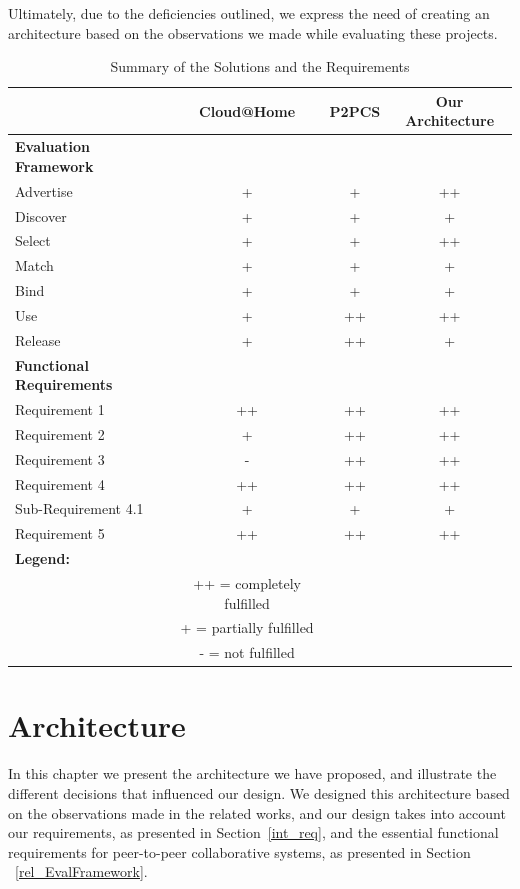 \documentclass[12pt, titlepage]{uo_temp}
\begin{document}
     Ultimately, due to the deficiencies outlined, we express the need of creating an
     architecture based on the observations we made while evaluating these projects.
     \\
     
     \begin{table}
     \begin{tabular}{l*{3}{c}}
       & Cloud@Home & P2PCS & Our Architecture \\ 
       \hline
       \textbf{Evaluation Framework}\\
       \hline
       Advertise & + & + & ++ \\
       Discover & + & + & + \\
       Select & + & + & ++ \\
       Match & + & + & + \\
       Bind & + & + & + \\
       Use & + & ++ & ++ \\
       Release & + & ++ & + \\
       \hline
       \hline
       \textbf{Functional Requirements}\\
       \hline
       Requirement 1 & ++ & ++ & ++ \\
       Requirement 2 & + & ++ & ++ \\
       Requirement 3 & - & ++ & ++ \\
       Requirement 4 & ++ & ++ & ++ \\
       Sub-Requirement 4.1 & + & + & + \\
       Requirement 5 & ++ & ++ & ++ \\
       \hline
       \hline
       \textbf{Legend:} &&&\\
       & ++ = completely fulfilled &&\\
       & + = partially fulfilled &&\\
       & - = not fulfilled &&\\
     \end{tabular}
     \caption{Summary of the Solutions and the Requirements}
     \end{table}


     \chapter{Architecture}\label{arch_chap}
     In this chapter we present the architecture we have proposed, and illustrate the
     different decisions that influenced our design. We designed this architecture based
     on the observations made in the related works, and our design takes into account our
     requirements, as presented in Section~\ref{int_req}, and the essential functional
     requirements for peer-to-peer collaborative systems, as presented in Section
     ~\ref{rel_EvalFramework}.
\end{document}
